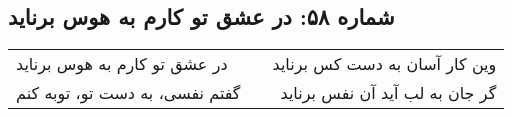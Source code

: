 \begin{center}
\section*{شماره ۵۸: در عشق تو کارم به هوس برناید}
\label{sec:058}
\begin{longtable}{l p{0.5cm} r}
در عشق تو کارم به هوس برناید
&&
وین کار آسان به دست کس برناید
\\
گفتم نفسی، به دست تو، توبه کنم
&&
گر جان به لب آید آن نفس برناید
\\
\end{longtable}
\end{center}
